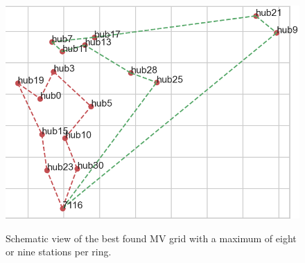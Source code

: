 \begin{figure}[h]
	\begin{centering}
		{\includegraphics[scale=0.7]{figures/experiments/ringsize/size_8_9.png}}
		\caption{Schematic view of the best found MV grid with a maximum of eight or nine stations per ring.}
		\label{fig:ringsize_8_9}
	\end{centering}
\end{figure}
